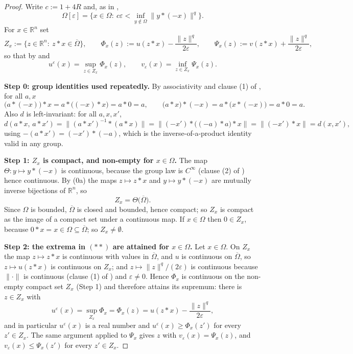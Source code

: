 \begin{proof}
Write $c:=1+4R$ and, as in ,
\[
 \Omega[\varepsilon]=\Big\{x\in\Omega:\ c\varepsilon<\inf_{y\notin\Omega}\|y*(-x)\|^{q}\Big\}. \tag{$\ast$}
\]
For $x\in\mathbb R^{n}$ set
\[
 Z_x:=\{z\in\mathbb R^{n}:\ z*x\in\overline\Omega\},
 \qquad
 \Phi_x(z):=u(z*x)-\frac{\|z\|^{q}}{2\varepsilon},
 \qquad
 \Psi_x(z):=v(z*x)+\frac{\|z\|^{q}}{2\varepsilon},
\]
so that by  and 
\[
 u^{\varepsilon}(x)=\sup_{z\in Z_x}\Phi_x(z),\qquad
 v_{\varepsilon}(x)=\inf_{z\in Z_x}\Psi_x(z). \tag{$\ast\ast$}
\]

\medskip\noindent\textbf{Step 0: group identities used repeatedly.} By associativity and
clause (1) of , for all $a,x$
\[
 \big(a*(-x)\big)*x=a*\big((-x)*x\big)=a*0=a,
 \qquad
 \big(a*x\big)*(-x)=a*\big(x*(-x)\big)=a*0=a. \tag{0a}
\]
Also $d$ is left-invariant: for all $a,x,x'$,
\[
 d(a*x,\,a*x')=\big\|(a*x')^{-1}*(a*x)\big\|
  =\big\|(-x')*\big((-a)*a\big)*x\big\|=\big\|(-x')*x\big\|=d(x,x'), \tag{0b}
\]
using $-(a*x')=(-x')*(-a)$, which is the inverse-of-a-product identity valid in any group.

\medskip\noindent\textbf{Step 1: $Z_x$ is compact, and non-empty for $x\in\Omega$.} The map
$\Theta:y\mapsto y*(-x)$ is continuous, because the group law is $C^{\infty}$ (clause (2) of
) hence continuous. By (0a) the maps $z\mapsto z*x$ and
$y\mapsto y*(-x)$ are mutually inverse bijections of $\mathbb R^{n}$, so
\[
 Z_x=\Theta\big(\overline\Omega\big).
\]
Since $\Omega$ is bounded, $\overline\Omega$ is closed and bounded, hence compact; so $Z_x$
is compact as the image of a compact set under a continuous map. If $x\in\Omega$ then
$0\in Z_x$, because $0*x=x\in\Omega\subseteq\overline\Omega$; so $Z_x\ne\emptyset$.

\medskip\noindent\textbf{Step 2: the extrema in $(\ast\ast)$ are attained for
$x\in\Omega$.} Let $x\in\Omega$. On $Z_x$ the map $z\mapsto z*x$ is continuous with values
in $\overline\Omega$, and $u$ is continuous on $\overline\Omega$, so $z\mapsto u(z*x)$ is
continuous on $Z_x$; and $z\mapsto\|z\|^{q}/(2\varepsilon)$ is continuous because
$\|\cdot\|$ is continuous (clause (1) of ) and $\varepsilon\neq0$. Hence
$\Phi_x$ is continuous on the non-empty compact set $Z_x$ (Step 1) and therefore attains its
supremum: there is $z\in Z_x$ with
\[
 u^{\varepsilon}(x)=\sup_{Z_x}\Phi_x=\Phi_x(z)=u(z*x)-\frac{\|z\|^{q}}{2\varepsilon}, \tag{2a}
\]
and in particular $u^{\varepsilon}(x)$ is a real number and
$u^{\varepsilon}(x)\ge\Phi_x(z')$ for every $z'\in Z_x$. The same argument applied to
$\Psi_x$ gives $z$ with $v_{\varepsilon}(x)=\Psi_x(z)$, and
$v_{\varepsilon}(x)\le\Psi_x(z')$ for every $z'\in Z_x$.


\end{proof}
